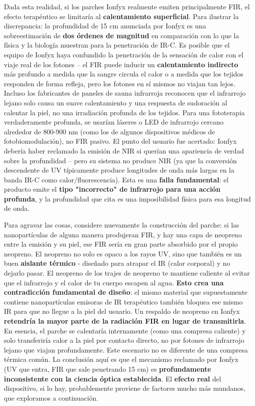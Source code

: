\documentclass{article}
\begin{document}
Dada esta realidad, si los parches Ionfyx realmente emiten principalmente FIR, el efecto terapéutico se limitaría al \textbf{calentamiento superficial}. Para ilustrar la discrepancia: la profundidad de 15 cm anunciada por Ionfyx es una sobreestimación de \textbf{dos órdenes de magnitud} en comparación con lo que la física y la biología muestran para la penetración de IR-C. Es posible que el equipo de Ionfyx haya confundido la penetración de la sensación de calor con el viaje real de los fotones – el FIR puede inducir un \textbf{calentamiento indirecto} más profundo a medida que la sangre circula el calor o a medida que los tejidos responden de forma refleja, pero los fotones en sí mismos no viajan tan lejos. Incluso los fabricantes de paneles de sauna infrarroja reconocen que el infrarrojo lejano solo causa un suave calentamiento y una respuesta de sudoración al calentar la piel, no una irradiación profunda de los tejidos. Para una fototerapia verdaderamente profunda, se usarían láseres o LED de infrarrojo cercano alrededor de 800-900 nm (como los de algunos dispositivos médicos de fotobiomodulación), no FIR pasivo. El punto del usuario fue acertado: Ionfyx debería haber reclamado la emisión de NIR si querían una apariencia de verdad sobre la profundidad – pero su sistema no produce NIR (ya que la conversión descendente de UV típicamente produce longitudes de onda más largas en la banda IR-C como calor/fluorescencia). Esta es una \textbf{falla fundamental}: el producto emite el \textbf{tipo "incorrecto" de infrarrojo para una acción profunda}, y la profundidad que cita es una imposibilidad física para esa longitud de onda.

Para agravar las cosas, considere nuevamente la construcción del parche: si las nanopartículas de alguna manera produjeran FIR, y hay una capa de neopreno entre la emisión y su piel, ese FIR sería en gran parte absorbido por el propio neopreno. El neopreno no solo es opaco a los rayos UV, sino que también es un buen \textbf{aislante térmico} - diseñado para atrapar el IR (calor corporal) y no dejarlo pasar. El neopreno de los trajes de neopreno te mantiene caliente al evitar que el infrarrojo y el calor de tu cuerpo escapen al agua. \textbf{Esto crea una contradicción fundamental de diseño}: el mismo material que supuestamente contiene nanopartículas emisoras de IR terapéutico también bloquea ese mismo IR para que no llegue a la piel del usuario. Un respaldo de neopreno en Ionfyx \textbf{retendría la mayor parte de la radiación FIR en lugar de transmitirla}. En esencia, el parche se calentaría internamente (como una compresa caliente) y solo transferiría calor a la piel por contacto directo, no por fotones de infrarrojo lejano que viajan profundamente. Este escenario no es diferente de una compresa térmica común. La conclusión aquí es que el mecanismo reclamado por Ionfyx (UV que entra, FIR que sale penetrando 15 cm) es \textbf{profundamente inconsistente con la ciencia óptica establecida}. El \textbf{efecto real} del dispositivo, si lo hay, probablemente proviene de factores mucho más mundanos, que exploramos a continuación.
\end{document}
